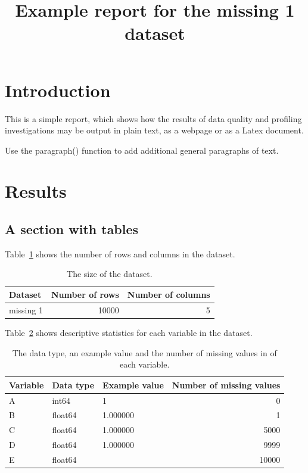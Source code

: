 \documentclass{article}
\title{Example report for the missing 1 dataset}
\begin{document}
\maketitle

\section{Introduction}

This is a simple report, which shows how the results of data quality and profiling investigations may be output in plain text, as a webpage or as a Latex document.

Use the paragraph() function to add additional general paragraphs of text.

\section{Results}

\subsection{A section with tables}

Table~\ref{tab:1} shows the number of rows and columns in the dataset.

\begin{table}
\caption{The size of the dataset.}
\label{tab:1}
\begin{tabular}{lrr}
\toprule
Dataset & Number of rows & Number of columns \\
\midrule
missing 1 & 10000 & 5 \\
\bottomrule
\end{tabular}
\end{table}

Table~\ref{tab:2} shows descriptive statistics for each variable in the dataset.

\begin{table}
\caption{The data type, an example value and the number of missing values in of each variable.}
\label{tab:2}
\begin{tabular}{lllr}
\toprule
Variable & Data type & Example value & Number of missing values \\
\midrule
A & int64 & 1 & 0 \\
B & float64 & 1.000000 & 1 \\
C & float64 & 1.000000 & 5000 \\
D & float64 & 1.000000 & 9999 \\
E & float64 &  & 10000 \\
\bottomrule
\end{tabular}
\end{table}
\end{document}

